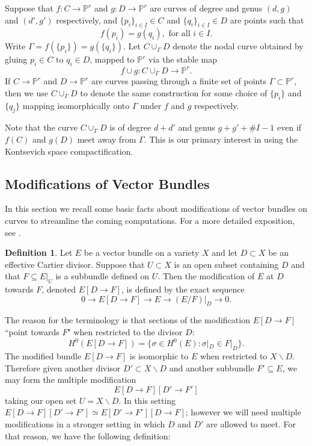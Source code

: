 \documentclass[11pt]{amsart}
\newcommand{\pp}{\mathbb{P}}
\newcommand{\defi}[1]{\textsf{#1}}
\theoremstyle{definition}
\newtheorem{defin}[thm]{Definition}
\theoremstyle{remark}
\begin{document}
Suppose that $f \colon C \to \pp^r$ and $g \colon D \to \pp^r$ are curves of degree and genus $(d,g)$ and $(d', g')$ respectively, and $\{p_i\}_{i \in I} \in C$ and $\{q_i\}_{i \in I} \in D$ are points such that 
\[f(p_i) = g(q_i),  \text{ for all $i \in I$}.\]
Write $\Gamma = f(\{p_i\}) = g(\{q_i\})$.  Let $C \cup_\Gamma D$ denote the nodal curve obtained by gluing $p_i \in C$ to $q_i \in D$, mapped to $\pp^r$ via the stable map
\[f\cup g \colon C \cup_\Gamma D \to \pp^r.\]
If $C \to \pp^r$ and $D \to \pp^r$ are curves passing through a finite set of points $\Gamma \subset \pp^r$, then we use $C \cup_\Gamma D$ to denote the same construction for some choice of $\{p_i\}$ and $\{q_j\}$ mapping isomorphically onto $\Gamma$ under $f$ and $g$ respectively.

Note that the curve $C \cup_\Gamma D$ is of degree $d + d'$ and genus $g + g' + \#I -1$ even if $f(C)$ and $g(D)$  meet away from $\Gamma$.  This is our primary interest in using the Kontsevich space compactification.

\subsection{Modifications of Vector Bundles}\label{modifications}

In this section we recall some basic facts about modifications of vector bundles on curves to streamline the coming computations.  For a more detailed exposition, see \cite[-3]{joint}.

\begin{defin}
Let $E$ be a vector bundle on a variety $X$ and let $D \subset X$ be an effective Cartier divisor.  Suppose that $U \subset X$ is an open subset containing $D$ and that $F \subseteq E|_U$ is a subbundle defined on $U$.  Then the \defi{modification of $E$ at $D$ towards $F$}, denoted $E[D \to F]$, is defined by the exact sequence
\[0 \to E[D \to F] \to E \to (E/F)|_D \to 0. \]
\end{defin}
The reason for the terminology is that sections of the modification $E[D \to F]$  ``point towards $F$" when restricted to the divisor $D$:
\[H^0(E[D \to F]) = \{ \sigma \in H^0(E) : \sigma|_D \in F|_D \}. \]
The modified bundle $E[D \to F]$ is isomorphic to $E$ when restricted to $X \smallsetminus D$.  Therefore given another divisor $D' \subset X \smallsetminus D$ and another subbundle $F' \subseteq E$, we may form the multiple modification
\[E[D \to F][D' \to F'] \]
taking our open set $U = X \smallsetminus D$.  In this setting $E[D \to F][D' \to F'] \simeq E[D' \to F'][D \to F]$;
however we will need multiple modifications in a stronger setting in which $D$ and $D'$ are allowed to meet. For that reason, we have the following definition:
\end{document}
